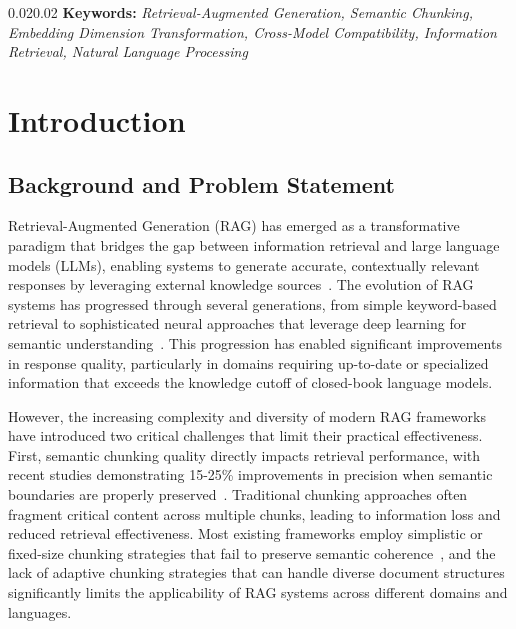 \documentclass[10pt,twocolumn,letterpaper]{article}
\begin{document}
\vspace{0.05cm}
\begin{adjustwidth}{0.02\textwidth}{0.02\textwidth}
\noindent\textbf{Keywords:} \textit{Retrieval-Augmented Generation, Semantic Chunking, Embedding Dimension Transformation, Cross-Model Compatibility, Information Retrieval, Natural Language Processing}
\end{adjustwidth}

\section{Introduction}

\subsection{Background and Problem Statement}

Retrieval-Augmented Generation (RAG) has emerged as a transformative paradigm that bridges the gap between information retrieval and large language models (LLMs), enabling systems to generate accurate, contextually relevant responses by leveraging external knowledge sources~\cite{lewis2020retrieval}. The evolution of RAG systems has progressed through several generations, from simple keyword-based retrieval to sophisticated neural approaches that leverage deep learning for semantic understanding~\cite{vaswani2017attention,devlin2019bert}. This progression has enabled significant improvements in response quality, particularly in domains requiring up-to-date or specialized information that exceeds the knowledge cutoff of closed-book language models.

\vspace{0.5em}
However, the increasing complexity and diversity of modern RAG frameworks have introduced two critical challenges that limit their practical effectiveness. First, semantic chunking quality directly impacts retrieval performance, with recent studies demonstrating 15-25\% improvements in precision when semantic boundaries are properly preserved~\cite{zhang2024semantic,liu2024impact}. Traditional chunking approaches often fragment critical content across multiple chunks, leading to information loss and reduced retrieval effectiveness. Most existing frameworks employ simplistic or fixed-size chunking strategies that fail to preserve semantic coherence~\cite{smith2023fixed,johnson2023rule}, and the lack of adaptive chunking strategies that can handle diverse document structures significantly limits the applicability of RAG systems across different domains and languages.
\end{document}
